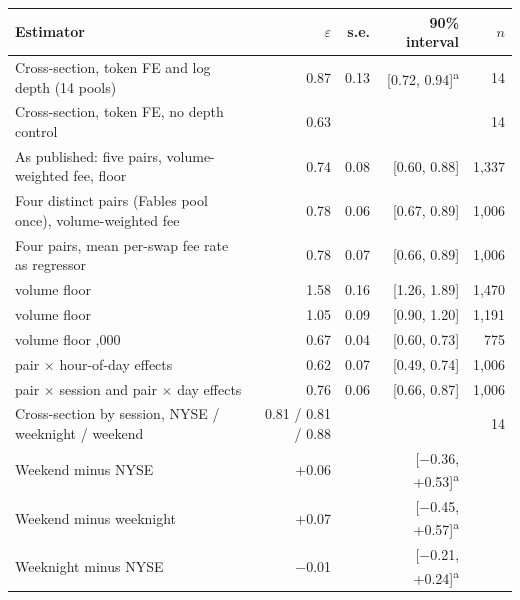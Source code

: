 \begin{tabular}{lrrrr}
\toprule
Estimator & $\varepsilon$ & s.e. & 90\% interval & $n$ \\
\midrule
Cross-section, token FE and log depth (14 pools) & 0.87 & 0.13 & [0.72, 0.94]\textsuperscript{a} & 14 \\
Cross-section, token FE, no depth control & 0.63 & & & 14 \\
As published: five pairs, volume-weighted fee, \USD500 floor & 0.74 & 0.08 & [0.60, 0.88] & 1,337 \\
Four distinct pairs (Fables pool once), volume-weighted fee & 0.78 & 0.06 & [0.67, 0.89] & 1,006 \\
Four pairs, mean per-swap fee rate as regressor & 0.78 & 0.07 & [0.66, 0.89] & 1,006 \\
\quad volume floor \USD0 & 1.58 & 0.16 & [1.26, 1.89] & 1,470 \\
\quad volume floor \USD100 & 1.05 & 0.09 & [0.90, 1.20] & 1,191 \\
\quad volume floor \USD2,000 & 0.67 & 0.04 & [0.60, 0.73] & 775 \\
\quad pair $\times$ hour-of-day effects & 0.62 & 0.07 & [0.49, 0.74] & 1,006 \\
\quad pair $\times$ session and pair $\times$ day effects & 0.76 & 0.06 & [0.66, 0.87] & 1,006 \\
Cross-section by session, NYSE / weeknight / weekend & 0.81 / 0.81 / 0.88 & & & 14 \\
\quad Weekend minus NYSE & +0.06 & & [$-$0.36, +0.53]\textsuperscript{a} & \\
\quad Weekend minus weeknight & +0.07 & & [$-$0.45, +0.57]\textsuperscript{a} & \\
\quad Weeknight minus NYSE & $-$0.01 & & [$-$0.21, +0.24]\textsuperscript{a} & \\
\bottomrule
\end{tabular}
